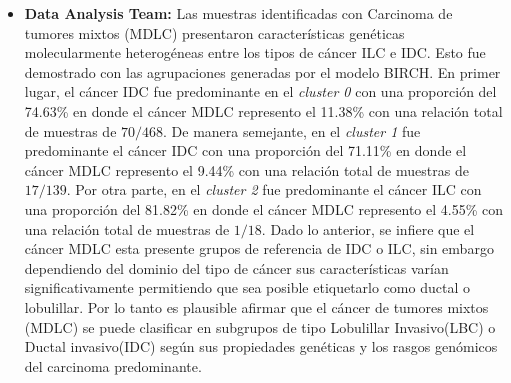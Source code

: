 \clearpage
{}
\begin{itemize}[label=\PencilRightDown]
	
	\item \textbf{Data Analysis Team:} Las muestras identificadas con Carcinoma de tumores mixtos (MDLC) presentaron características genéticas molecularmente heterogéneas entre los tipos de cáncer ILC e IDC. Esto fue demostrado con las agrupaciones generadas por el modelo BIRCH. En primer lugar, el cáncer IDC fue predominante en el \textit{cluster 0} con una proporción del 74.63\% en donde el cáncer MDLC represento el 11.38\% con una relación total de muestras de $70/468$. De manera semejante, en el \textit{cluster 1} fue predominante el cáncer IDC con una proporción del 71.11\% en donde el cáncer MDLC represento el 9.44\% con una relación total de muestras de $17/139$. Por otra parte, en el \textit{cluster 2} fue predominante el cáncer ILC con una proporción del 81.82\% en donde el cáncer MDLC represento el 4.55\% con una relación total de muestras de $1/18$. Dado lo anterior, se infiere que el cáncer MDLC esta presente grupos de referencia de IDC o ILC, sin embargo dependiendo del dominio del tipo de cáncer sus características varían significativamente permitiendo que sea posible etiquetarlo como ductal o lobulillar. Por lo tanto es plausible afirmar que el cáncer de tumores mixtos (MDLC) se puede clasificar en subgrupos de tipo Lobulillar Invasivo(LBC) o Ductal invasivo(IDC) según sus propiedades genéticas y los rasgos genómicos del carcinoma predominante.
	

\end{itemize}
